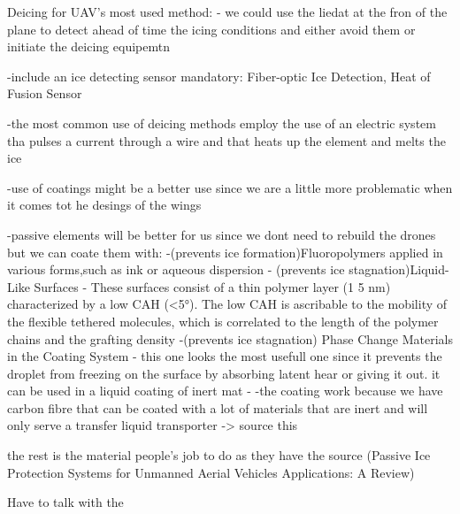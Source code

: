 Deicing for UAV's most used method:
- we could use the liedat at the fron of the plane to detect ahead of time the icing conditions and either avoid them or initiate the deicing equipemtn

-include an ice detecting sensor mandatory: Fiber-optic Ice Detection,  Heat of Fusion Sensor

-the most common use of deicing methods employ the use of an electric system tha pulses a current through a wire and that heats up the element and melts the ice

-use of coatings might be a better use since we are a little more problematic when it comes tot he desings of the wings

-passive elements will be better for us since we dont need to rebuild the drones but we can coate them with: 
                    -(prevents ice formation)Fluoropolymers applied in various forms,such as ink or aqueous dispersion
                    - (prevents ice stagnation)Liquid-Like Surfaces - These surfaces consist of a thin polymer layer (1 5 nm) characterized by a low CAH (<5°). The low CAH is ascribable to the mobility of the flexible tethered molecules, which is correlated to the length of the polymer chains and the grafting density
                    -(prevents ice stagnation) Phase Change Materials in the Coating System - this one looks the most usefull one since it prevents the droplet from freezing on the surface by absorbing latent hear or giving it out. it can be used in a liquid coating of inert mat
                    - 
-the coating work because we have carbon fibre that can be coated with a lot of materials that are inert and will only serve a transfer liquid transporter -> source this

the rest is the material people's job to do as they have the source (Passive Ice Protection Systems for Unmanned Aerial
Vehicles Applications: A Review)

Have to talk with the 